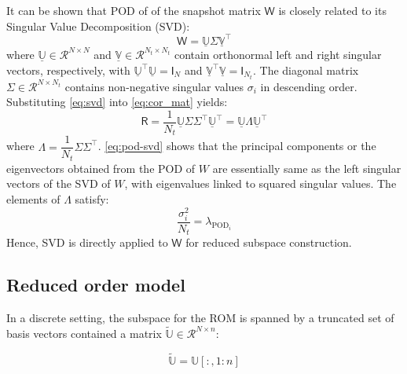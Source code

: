 \documentclass[11pt]{article}
\newcommand{\mat}[1]{\mathsf{#1}}
\begin{document}
It can be shown that POD of of the snapshot matrix \(\mat{W}\)  is closely related to its Singular Value Decomposition (SVD):
\begin{equation}
\mat{W} = \underline{\mathbb{U}}\mat{\Sigma}\underline{\mathbb{V}}^\top
\label{eq:svd}
\end{equation}
where $\underline{\mathbb{U}}\in\mathcal{R}^{N \times N}$ and $\underline{\mathbb{V}}\in\mathcal{R}^{N_t \times N_t}$ contain orthonormal left and right singular vectors, respectively, with $\underline{\mathbb{U}}^\top\underline{\mathbb{U}} = \mat{I}_N$ and $\underline{\mathbb{V}}^\top\underline{\mathbb{V}} = \mat{I}_{N_t}$. The diagonal matrix $\mat{\Sigma}\in\mathcal{R}^{N \times N_t}$ contains non-negative singular values $\sigma_i$ in descending order. 
Substituting \eqref{eq:svd} into \eqref{eq:cor_mat} yields:
\begin{equation}
\mat{R} = \frac{1}{N_t} \underline{\mathbb{U}} \mat{\Sigma} \mat{\Sigma}^\top \underline{\mathbb{U}}^\top = \underline{\mathbb{U}}\mat{\Lambda}\underline{\mathbb{U}}^\top
\label{eq:pod-svd}
\end{equation}
where $\mat{\Lambda} = \dfrac{1}{N_t}\mat{\Sigma}\mat{\Sigma}^\top$.
\cref{eq:pod-svd} shows that the principal components or the eigenvectors obtained from the POD of $W$ are essentially same as the left singular vectors of the SVD of $W$, with eigenvalues linked to squared singular values. 
The elements of $\mat{\Lambda}$ satisfy:
\begin{equation}
\frac{\sigma_i^2}{N_t} = \lambda_{\text{POD}_i}
\label{eq:SVD_POD}
\end{equation}
Hence, SVD is directly applied to $\mat{W}$ for reduced subspace construction.




\subsection{Reduced order model}
\label{sec:ROM}
In a discrete setting, the subspace for the ROM  is spanned by a truncated set of basis vectors contained a matrix $\widetilde{\mathbb{U}}\in\mathcal{R}^{N\times n}$:

\begin{equation}
\widetilde{\mathbb{U}} = \mathbb{U}[:,1:n]
\label{eq:U_tilde}
\end{equation}
\end{document}
